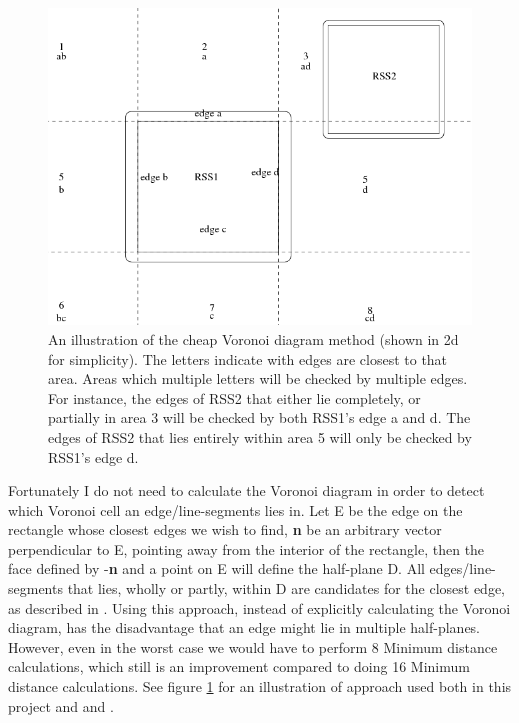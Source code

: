 \begin{figure}
\centering
\includegraphics[width=\textwidth]{figures/vorCheap}
\caption{\label{vor-cheap}An illustration of the cheap Voronoi diagram method (shown in 2d for simplicity). The letters indicate with edges are closest to that area. Areas which multiple letters will be checked by multiple edges. For instance, the edges of RSS2 that either lie completely, or partially in area 3 will be checked by both RSS1's edge a and d. The edges of RSS2 that lies entirely within area 5 will only be checked by RSS1's edge d.}
\end{figure}

Fortunately I do not need to calculate the Voronoi diagram in order to detect which Voronoi cell an edge/line-segments lies in. Let E be the edge on the rectangle whose closest edges we wish to find, \textbf{n} be an arbitrary vector perpendicular to E, pointing away from the interior of the rectangle, then the face defined by -\textbf{n} and a point on E will define the half-plane D. All edges/line-segments that lies, wholly or partly, within D are candidates for the closest edge, as described in \cite{larsen00fast}. Using this approach, instead of explicitly calculating the Voronoi diagram, has the disadvantage that an edge might lie in multiple half-planes. However, even in the worst case we would have to perform 8 Minimum distance calculations, which still is an improvement compared to doing 16 Minimum distance calculations. See figure \ref{vor-cheap} for an illustration of approach used both in this project and \cite{larsen00fast} and \cite{Larsen99fastproximity}.

